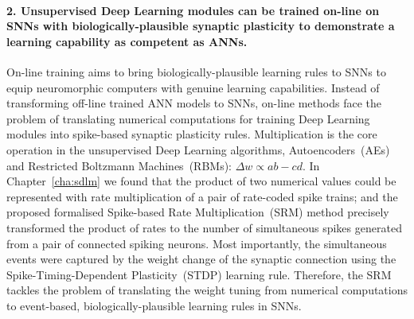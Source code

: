 \paragraph{2. Unsupervised Deep Learning modules can be trained on-line on SNNs with biologically-plausible synaptic plasticity to demonstrate a learning capability as competent as ANNs.\\}


On-line training aims to bring biologically-plausible learning rules to SNNs to equip neuromorphic computers with genuine learning capabilities.
Instead of transforming off-line trained ANN models to SNNs, on-line methods face the problem of translating numerical computations for training Deep Learning modules into spike-based synaptic plasticity rules.
Multiplication is the core operation in the unsupervised Deep Learning algorithms, Autoencoders~(AEs) and Restricted Boltzmann Machines~(RBMs): $\Delta w \propto ab-cd$.
In Chapter~\ref{cha:sdlm} we found that the product of two numerical values could be represented with rate multiplication of a pair of rate-coded spike trains;
and the proposed formalised Spike-based Rate Multiplication~(SRM) method precisely transformed the product of rates to the number of simultaneous spikes generated from a pair of connected spiking neurons.
Most importantly, the simultaneous events were captured by the weight change of the synaptic connection using the Spike-Timing-Dependent Plasticity~(STDP) learning rule.
Therefore, the SRM tackles the problem of translating the weight tuning from numerical computations to event-based, biologically-plausible learning rules in SNNs.

